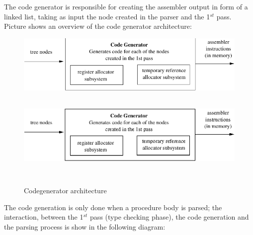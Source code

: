 \documentclass [a4paper,12pt]{article}
\begin{document}
The code generator is responsible for creating the assembler output in form
of a linked list, taking as input the node created in the parser and the
1$^{st}$ pass. Picture  shows an overview of the code generator
architecture:

\begin{figure}
\ifpdf
\includegraphics{arch9.pdf}
\else
\includegraphics[width=5.68in,height=1.76in]{arch9.eps}
\fi
\label{fig:fig9}
\caption{Codegenerator architecture}
\end{figure}

The code generation is only done when a procedure body is parsed; the
interaction, between the 1$^{st}$ pass (type checking phase), the code
generation and the parsing process is show in the following diagram:
\end{document}
